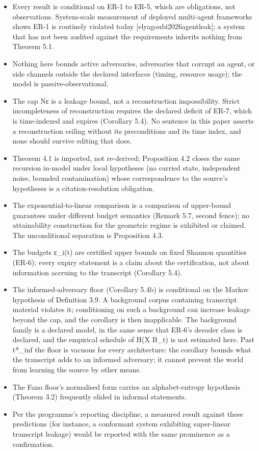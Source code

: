 \documentclass[
  11pt,
]{article}
\providecommand{\tightlist}{%
  \setlength{\itemsep}{0pt}\setlength{\parskip}{0pt}}
\begin{document}
\begin{itemize}
\tightlist
\item
  Every result is conditional on ER-1 to ER-5, which are obligations,
  not observations. System-scale measurement of deployed multi-agent
  frameworks shows ER-1 is routinely violated today
  {[}elyagoubi2026agentleak{]}; a system that has not been audited
  against the requirements inherits nothing from Theorem 5.1.
\item
  Nothing here bounds active adversaries, adversaries that corrupt an
  agent, or side channels outside the declared interfaces (timing,
  resource usage); the model is passive-observational.
\item
  The cap Nε is a leakage bound, not a reconstruction impossibility.
  Strict incompleteness of reconstruction requires the declared deficit
  of ER-7, which is time-indexed and expires (Corollary 5.4). No
  sentence in this paper asserts a reconstruction ceiling without its
  preconditions and its time index, and none should survive editing that
  does.
\item
  Theorem 4.1 is imported, not re-derived; Proposition 4.2 closes the
  same recursion in-model under local hypotheses (no carried state,
  independent noise, bounded contamination) whose correspondence to the
  source's hypotheses is a citation-resolution obligation.
\item
  The exponential-to-linear comparison is a comparison of upper-bound
  guarantees under different budget semantics (Remark 5.7, second
  fence); no attainability construction for the geometric regime is
  exhibited or claimed. The unconditional separation is Proposition 4.3.
\item
  The budgets ε\_i(t) are certified upper bounds on fixed Shannon
  quantities (ER-6); every expiry statement is a claim about the
  certification, not about information accruing to the transcript
  (Corollary 5.4).
\item
  The informed-adversary floor (Corollary 5.4b) is conditional on the
  Markov hypothesis of Definition 3.9. A background corpus containing
  transcript material violates it; conditioning on such a background can
  increase leakage beyond the cap, and the corollary is then
  inapplicable. The background family is a declared model, in the same
  sense that ER-6's decoder class is declared, and the empirical
  schedule of H(X \textbar{} B\_t) is not estimated here. Past t*\_inf
  the floor is vacuous for every architecture: the corollary bounds what
  the transcript adds to an informed adversary; it cannot prevent the
  world from learning the source by other means.
\item
  The Fano floor's normalised form carries an alphabet-entropy
  hypothesis (Theorem 3.2) frequently elided in informal statements.
\item
  Per the programme's reporting discipline, a measured result against
  these predictions (for instance, a conformant system exhibiting
  super-linear transcript leakage) would be reported with the same
  prominence as a confirmation.
\end{itemize}
\end{document}
